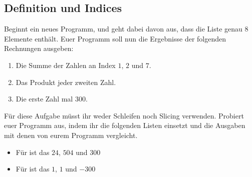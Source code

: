 \subsection{Definition und Indices }

Beginnt ein neues Programm, und geht dabei davon aus, dass die Liste
 genau $8$ Elemente enthält. Euer Programm soll
nun die Ergebnisse der folgenden Rechnungen ausgeben:

\begin{enumerate}
    \item Die Summe der Zahlen an Index $1$, $2$ und $7$.
    \item Das Produkt jeder zweiten Zahl.
    \item Die erste Zahl mal 300.
\end{enumerate}

Für diese Aufgabe müsst ihr weder Schleifen noch Slicing verwenden. Probiert
euer Programm aus, indem ihr die folgenden Listen einsetzt und die Ausgaben
mit denen von eurem Programm vergleicht.

\begin{itemize}
    \item Für  ist das $24$, $504$ und $300$
    \item Für  ist das $1$, $1$ und $-300$
\end{itemize}
